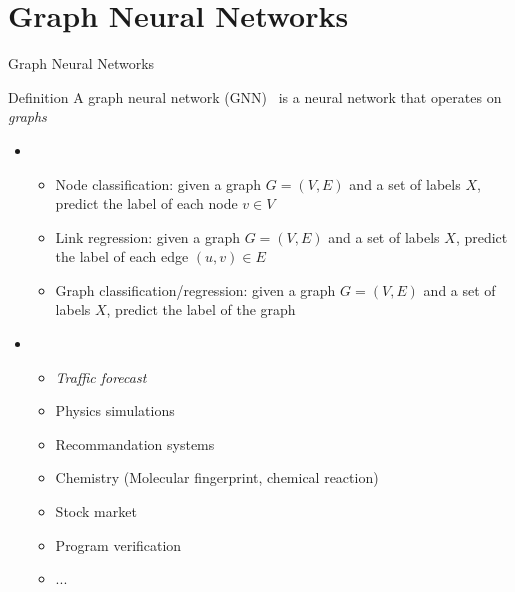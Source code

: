 \documentclass[presentation, 9pt]{beamer}\mode<presentation>{\usetheme{AMSBolognaFC}}
\begin{document}
\section{Graph Neural Networks}
\begin{frame}{Graph Neural Networks}
\begin{alertblock}{Definition}
	A graph neural network (GNN)~ is a neural network that operates on \textit{graphs}
\end{alertblock}
\begin{itemize}
	\item {}
	\begin{itemize}
		\item Node classification: given a graph $G=(V,E)$ and a set of labels $X$, predict the label of each node $v \in V$
		\item Link regression: given a graph $G=(V,E)$ and a set of labels $X$, predict the label of each edge $(u,v) \in E$
		\item Graph classification/regression: given a graph $G=(V,E)$ and a set of labels $X$, predict the label of the graph
	\end{itemize}
	\item {}
	\begin{itemize}
		\item \emph{Traffic forecast}
		\item Physics simulations~
		\item Recommandation systems~
		\item Chemistry (Molecular fingerprint, chemical reaction)~
		\item Stock market~
		\item Program verification~
		\item ...
	\end{itemize}
\end{itemize}
\end{frame}
\end{document}
